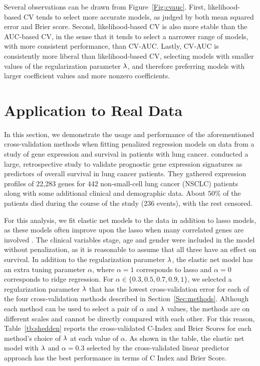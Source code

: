 Several observations can be drawn from Figure~\ref{Fig:cvauc}. First, likelihood-based CV tends to select more accurate models, as judged by both mean squared error and Brier score.  Second, likelihood-based CV is also more stable than the AUC-based CV, in the sense that it tends to select a narrower range of models, with more consistent performance, than CV-AUC.  Lastly, CV-AUC is consistently more liberal than likelihood-based CV, selecting models with smaller values of the regularization parameter $\lambda$, and therefore preferring models with larger coefficient values and more nonzero coefficients.

\section{Application to Real Data}

In this section, we demonstrate the usage and performance of the aforementioned cross-validation methods when fitting penalized regression models on data from a study of gene expression and survival in patients with lung cancer. \citet{shedden2008gene} conducted a large, retrospective study to validate prognostic gene expression signatures as predictors of overall survival in lung cancer patients. They gathered expression profiles of 22,283 genes for 442 non-small-cell lung cancer (NSCLC) patients along with some additional clinical and demographic data. About $50\%$ of the patients died during the course of the study (236 events), with the rest censored. 

For this analysis, we fit elastic net models to the data in addition to lasso models, as these models often improve upon the lasso when many correlated genes are involved \citep{Zou2005}. The clinical variables stage, age and gender were included in the model without penalization, as it is reasonable to assume that all three have an effect on survival. In addition to the regularization parameter $\lambda$, the elastic net model has an extra tuning parameter $\alpha$, where $\alpha=1$ corresponds to lasso and $\alpha=0$ corresponds to ridge regression. For $\alpha \in \{0.3, 0.5, 0.7, 0.9, 1\}$, we selected a regularization parameter $\lambda$ that has the lowest cross-validation error for each of the four cross-validation methods described in Section~\ref{Sec:methods}.  Although each method can be used to select a pair of $\alpha$ and $\lambda$ values, the methods are on different scales and cannot be directly compared with each other.  For this reason, Table~\ref{tb:shedden} reports the cross-validated C-Index and Brier Scores for each method's choice of $\lambda$ at each value of $\alpha$.  As shown in the table, the elastic net model with $\lambda$ and $\alpha=0.3$ selected by the cross-validated linear predictor approach has the best performance in terms of C Index and Brier Score.

